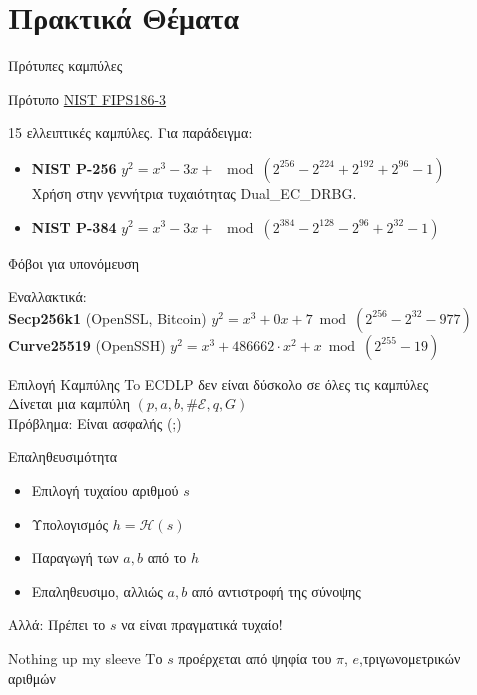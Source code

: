\documentclass[handout]{beamer}
\begin{document}
\section{Πρακτικά Θέματα}

\begin{frame}{Πρότυπες καμπύλες}
\begin{small}
\begin{block}{Πρότυπο \href{http://csrc.nist.gov/publications/fips/fips186-3/fips_186-3.pdf}{NIST FIPS186-3}}

15 ελλειπτικές καμπύλες. Για παράδειγμα:

\begin{itemize}  
\item \textbf{NIST P-256}
$y^2 = x^3-3x+$ $\bmod ( 2^{256} - 2^{224} + 2^{192} + 2^{96} - 1) $\\
\pause
Χρήση στην γεννήτρια τυχαιότητας Dual\_EC\_DRBG.
\pause
\item \textbf{NIST P-384 }
$y^2 = x^3-3x+$ $\bmod
  (2^{384}- 2^{128} - 2^{96} + 2^{32} - 1) $
\end{itemize}

\alert{Φόβοι για υπονόμευση}
\end{block}
\pause
Εναλλακτικά:\\
\textbf{Secp256k1}  (OpenSSL, Bitcoin) $y^2 = x^3+0x+7 \bmod (2^{256} - 2^{32} - 977)$ \\
\textbf{Curve25519} (OpenSSH) $y^2 = x^3+486662 \cdot x^2+x \bmod (2^{255}-19) $
\end{small}
\end{frame}



\begin{frame}{Επιλογή Καμπύλης}
\alert{To ECDLP δεν είναι δύσκολο σε όλες τις καμπύλες}\\
\pause
Δίνεται μια καμπύλη $(p,a,b,\# \mathcal{E},q,G)$\\
\alert{Πρόβλημα:} Είναι ασφαλής (;)
\pause
\begin{block}{Επαληθευσιμότητα}
\begin{itemize}
\item Επιλογή τυχαίου αριθμού $s$
\item Υπολογισμός $h=\mathcal{H}(s)$
\item Παραγωγή των $a,b$ από το $h$
\item Επαληθευσιμο, αλλιώς $a,b$ από αντιστροφή της σύνοψης
\end{itemize}
\end{block}
\pause
\alert{Αλλά:} Πρέπει το $s$ να είναι πραγματικά τυχαίο!
\begin{block}{Nothing up my sleeve}
Το $s$ προέρχεται από ψηφία του $\pi$, $e$,τριγωνομετρικών αριθμών
\end{block}
\end{frame}
\end{document}
